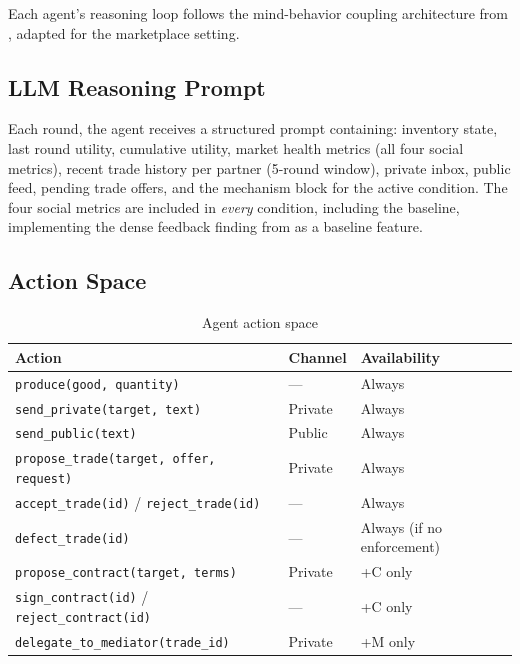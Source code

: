 \documentclass[12pt, a4paper]{article}
\begin{document}
Each agent's reasoning loop follows the mind-behavior coupling architecture from \citet{agentsociety}, adapted for the marketplace setting.

\subsection{LLM Reasoning Prompt}

Each round, the agent receives a structured prompt containing: inventory state, last round utility, cumulative utility, market health metrics (all four social metrics), recent trade history per partner (5-round window), private inbox, public feed, pending trade offers, and the mechanism block for the active condition. The four social metrics are included in \textit{every} condition, including the baseline, implementing the dense feedback finding from \citet{gallego2024} as a baseline feature.

\subsection{Action Space}

\begin{table}[H]
\centering
\caption{Agent action space}
\label{tab:actions}
\begin{tabular}{@{}lll@{}}
\toprule
Action & Channel & Availability \\
\midrule
\texttt{produce(good, quantity)} & — & Always \\
\texttt{send\_private(target, text)} & Private & Always \\
\texttt{send\_public(text)} & Public & Always \\
\texttt{propose\_trade(target, offer, request)} & Private & Always \\
\texttt{accept\_trade(id)} / \texttt{reject\_trade(id)} & — & Always \\
\texttt{defect\_trade(id)} & — & Always (if no enforcement) \\
\texttt{propose\_contract(target, terms)} & Private & +C only \\
\texttt{sign\_contract(id)} / \texttt{reject\_contract(id)} & — & +C only \\
\texttt{delegate\_to\_mediator(trade\_id)} & Private & +M only \\
\bottomrule
\end{tabular}
\end{table}

\end{document}
